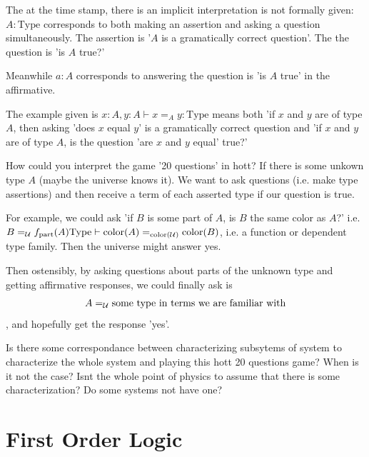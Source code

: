 \documentclass{book}
\begin{document}
	The at the time stamp, there is an implicit interpretation is not formally given: $A: \text{Type}$ corresponds to both making an assertion and asking a question simultaneously. The assertion is '$A$ is a gramatically correct question'. The the question is 'is $A$ true?'
	
	
	Meanwhile $a: A$ corresponds to answering the question is 'is $A$ true' in the affirmative.
	
	The example given is $x:A, y:A \vdash x =_A y:\text{Type}$ means both 'if $x$ and $y$ are of type $A$, then asking 'does $x$ equal $y$' is a gramatically correct question and 'if $x$ and $y$ are of type $A$, is the question 'are $x$ and $y$ equal' true?'
	
	How could you interpret the game '20 questions' in hott? If there is some unkown type $A$ (maybe the universe knows it). We want to ask questions (i.e. make type assertions) and then receive a term of each asserted type if our question is true. 
	
	For example, we could ask 'if $B$ is some part of $A$, is $B$ the same color as $A$?' i.e.  $B =_{\mathcal{U}} f_{\text{part}}(A) \text{Type} \vdash \text{color}(A) =_{\text{color}(\mathcal{U})} \text{color}(B)$, i.e. a function or dependent type family. Then the universe might answer yes. 
	
	Then ostensibly, by asking questions about parts of the unknown type and getting affirmative responses, we could finally ask is 
	$$A =_{\mathcal{U}} \text{some type in terms we are familiar with}$$, and hopefully get the response 'yes'. 
	
	Is there some correspondance between characterizing subsytems of system to characterize the whole system and playing this hott 20 questions game? When is it not the case? Isnt the whole point of physics to assume that there is some characterization? Do some systems not have one? 
	
	
	
	
	
	
	
	
	
	
	
	
	
	
	
	
	
	
	
	
	
	
	
	
	
	\chapter{First Order Logic}
	
\end{document}
